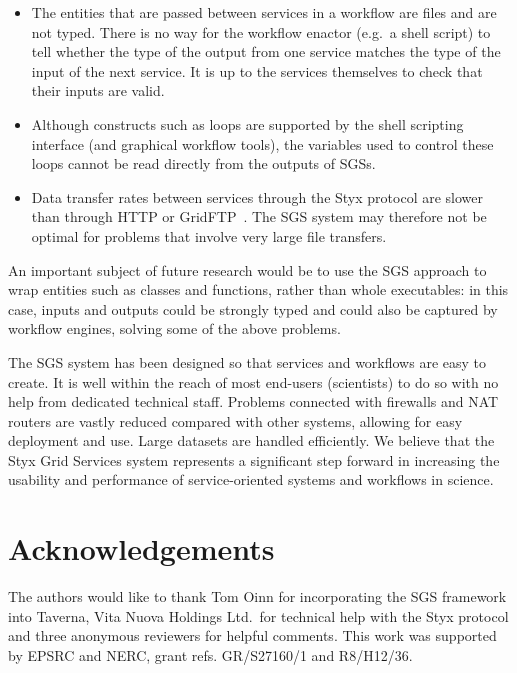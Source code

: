 \documentclass[a4paper]{article}
\begin{document}
\begin{itemize}
	\item The entities that are passed between services in a workflow are files and are not typed.  There is no way for the workflow enactor (e.g.\ a shell script) to tell whether the type of the output from one service matches the type of the input of the next service.  It is up to the services themselves to check that their inputs are valid.
	\item Although constructs such as loops are supported by the shell scripting interface (and graphical workflow tools), the variables used to control these loops cannot be read directly from the outputs of SGSs.
	\item Data transfer rates between services through the Styx protocol are slower than through HTTP or GridFTP~\cite{blower:2005}.  The SGS system may therefore not be optimal for problems that involve very large file transfers.
\end{itemize}

An important subject of future research would be to use the SGS approach to wrap entities such as classes and functions, rather than whole executables: in this case, inputs and outputs could be strongly typed and could also be captured by workflow engines, solving some of the above problems.

The SGS system has been designed so that services and workflows are easy to create.  It is well within the reach of most end-users (scientists) to do so with no help from dedicated technical staff.  Problems connected with firewalls and NAT routers are vastly reduced compared with other systems, allowing for easy deployment and use.  Large datasets are handled efficiently.  We believe that the Styx Grid Services system represents a significant step forward in increasing the usability and performance of service-oriented systems and workflows in science.
%

\section*{Acknowledgements}
The authors would like to thank Tom Oinn for incorporating the SGS framework into Taverna, Vita Nuova Holdings Ltd.\ for technical help with the Styx protocol and three anonymous reviewers for helpful comments.  This work was supported by EPSRC and NERC, grant refs. GR/S27160/1 and R8/H12/36.




\newpage
\singlespace
\end{document}

